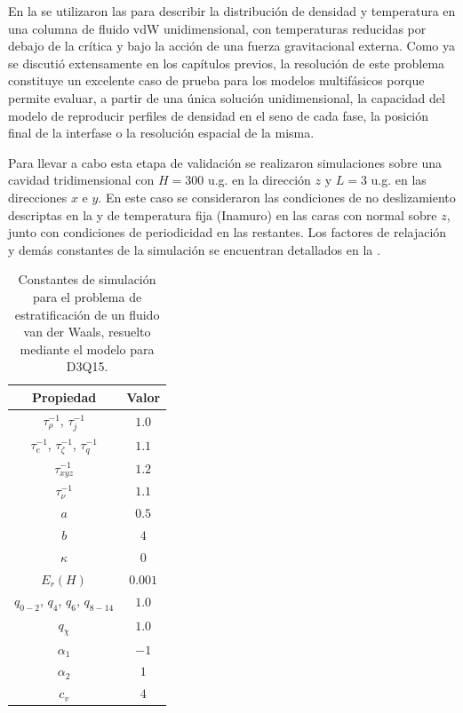 En la  se utilizaron las  para describir la distribuci\'on de densidad y temperatura en una columna de fluido vdW unidimensional, con temperaturas reducidas por debajo de la cr\'itica y bajo la acci\'on de una fuerza gravitacional externa. Como ya se discuti\'o extensamente en los cap\'itulos previos, la resoluci\'on de este problema constituye un excelente caso de prueba para los modelos multif\'asicos \pp{} porque permite evaluar, a partir de una \'unica soluci\'on unidimensional, la capacidad del modelo de reproducir perfiles de densidad en el seno de cada fase, la posici\'on final de la interfase o la resoluci\'on espacial de la misma.

Para llevar a cabo esta etapa de validaci\'on se realizaron simulaciones sobre una cavidad tridimensional con $H=300$ u.g. en la direcci\'on $z$ y $L=3$ u.g. en las direcciones $x$ e $y$. En este caso se consideraron las condiciones de no deslizamiento descriptas en la  y de temperatura fija (Inamuro) en las caras con normal sobre $z$, junto con condiciones de periodicidad en las restantes. Los factores de relajaci\'on y dem\'as constantes de la simulaci\'on se encuentran detallados en la .

\begin{table}[ht]
	\centering
    \begin{tabular}{c c}
	    \toprule
        \bf Propiedad & \bf Valor \\
        \midrule
        $\tau_{\rho}^{-1}$, $\tau_{j}^{-1}$ & $1.0$ \\
        $\tau_{e}^{-1}$, $\tau_{\zeta}^{-1}$, $\tau_{q}^{-1}$ & $1.1$ \\
        $\tau_{xyz}^{-1}$ & $1.2$ \\
        $\tau_{\nu}^{-1}$ & $1.1$ \\
		$a$ & $0.5$ \\
		$b$ & $4$ \\
		$\kappa$   & 0 \\
		$E_r (H)$  & $0.001$ \\
		$q_{0-2}$, $q_4$, $q_{6}$, $q_{8-14}$ & $1.0$ \\
		$q_{\chi}$ & $1.0$ \\
		$\alpha_1$ & $-1$ \\
		$\alpha_2$ & $1$ \\
		$c_v$      & $4$ \\
        \bottomrule
	\end{tabular}
	\caption{Constantes de simulaci\'on para el problema de estratificaci\'on de un fluido van der Waals, resuelto mediante el modelo para D3Q15.}
	\label{tab:vdwColumn3D_prop}
\end{table}  


